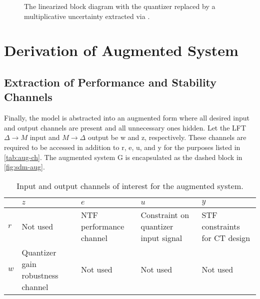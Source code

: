 \begin{figure}[h]
\begin{tikzpicture}[ampersand replacement=\&,scale=0.75, every node/.style={scale=0.75}]
	\end{tikzpicture}
	\caption{The linearized block diagram with the quantizer replaced by a multiplicative uncertainty extracted via .} \label{fig:sdm-stdf-lft}
\end{figure}

\section{Derivation of Augmented System}

\subsection{Extraction of Performance and Stability Channels}

Finally, the model is abstracted into an augmented form where all desired input and output channels are present and all unnecessary ones hidden. Let the \gls{LFT} $\Delta \rightarrow M$ input and $M \rightarrow \Delta$ output be \gls{w} and \gls{z}, respectively. These channels are required to be accessed in addition to \gls{r}, \gls{e}, \gls{u}, and \gls{y} for the purposes listed in \autoref{tab:aug-ch}. The augmented system \gls{G} is encapsulated as the dashed block in \autoref{fig:sdm-aug}.

\begin{table}[t]
	\caption{Input and output channels of interest for the augmented system.} \label{tab:aug-ch}
	\begin{tabular}{l | >{\RaggedRight}p{2cm} >{\RaggedRight}p{2.25cm} >{\RaggedRight}p{2.25cm} >{\RaggedRight}p{2cm}}
		\toprule
		\diagbox[width=2cm, height=1cm]{\textbf{Input}}{\textbf{Output}} & $z$ & $e$ & $u$ & $y$ \\
		\midrule
		$r$ & Not used & \gls{NTF} performance channel & Constraint on quantizer input signal & \gls{STF} constraints for \gls{CT} design \\
		$w$ & Quantizer gain robustness channel & Not used & Not used & Not used \\
		\bottomrule
	\end{tabular}
\end{table}

